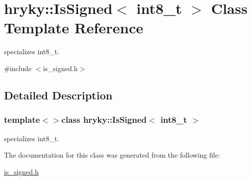 \hypertarget{classhryky_1_1_is_signed_3_01int8__t_01_4}{\section{hryky\-:\-:Is\-Signed$<$ int8\-\_\-t $>$ Class Template Reference}
\label{classhryky_1_1_is_signed_3_01int8__t_01_4}
}


specializes int8\-\_\-t.  




{\ttfamily \#include $<$is\-\_\-signed.\-h$>$}



\subsection{Detailed Description}
\subsubsection*{template$<$$>$class hryky\-::\-Is\-Signed$<$ int8\-\_\-t $>$}

specializes int8\-\_\-t. 

The documentation for this class was generated from the following file\-:\begin{DoxyCompactItemize}
\item 
\hyperlink{is__signed_8h}{is\-\_\-signed.\-h}\end{DoxyCompactItemize}
